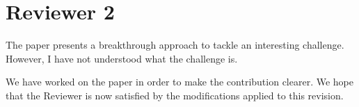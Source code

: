 %
%
\section*{Reviewer 2}
%
%
\begin{ReviewerComment}{2}
The paper presents a breakthrough approach to tackle an interesting challenge. However, I have not understood what the challenge is.\end{ReviewerComment}
%
\begin{Answer}
We have worked on the paper in order to make the contribution clearer. We hope that the Reviewer is now satisfied by the modifications applied to this revision.
 \RevTaskDone
\end{Answer}
%
%